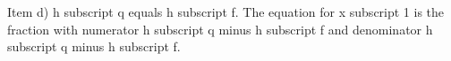 Item d) h subscript q equals h subscript f. The equation for x subscript 1 is the fraction with numerator h subscript q minus h subscript f and denominator h subscript q minus h subscript f.